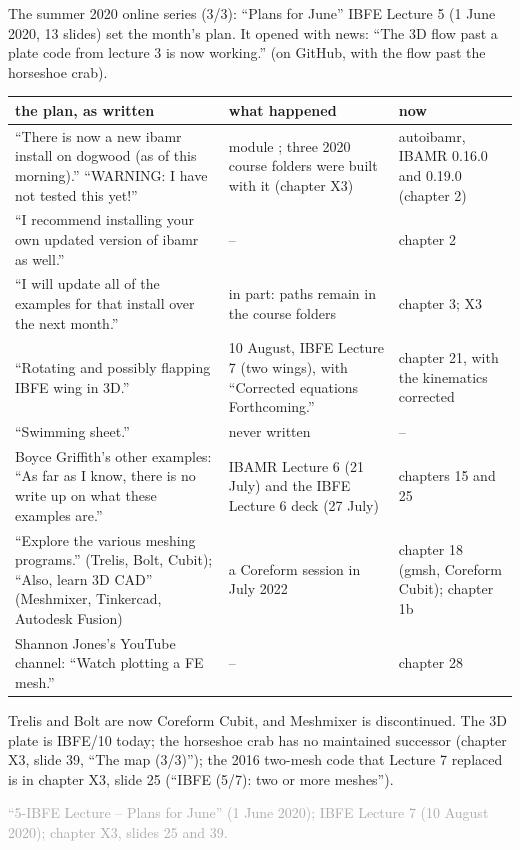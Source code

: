 \documentclass[aspectratio=169,11pt]{beamer}
\newcommand{\sourcecredit}[1]{\vfill\begin{flushright}\tiny\textcolor{DarkGray}{#1}\end{flushright}}
\begin{document}
\begin{frame}{The summer 2020 online series (3/3): ``Plans for June''}
\label{fr:z3}
\footnotesize IBFE Lecture 5 (1 June 2020, 13 slides) set the month's plan. It opened with news: ``The 3D flow past a plate code from lecture 3 is now working.'' (on GitHub, with the flow past the horseshoe crab).

\vspace{1mm}
\tiny
\renewcommand{\arraystretch}{1.15}
\setlength{\tabcolsep}{3pt}
\begin{tabular}{@{}L{0.42\textwidth}L{0.3\textwidth}L{0.22\textwidth}@{}}
\toprule
the plan, as written & what happened & now \\
\midrule
``There is now a new ibamr install on dogwood (as of this morning).'' ``WARNING: I have not tested this yet!'' & module ; three 2020 course folders were built with it (chapter X3) & autoibamr, IBAMR 0.16.0 and 0.19.0 (chapter 2) \\
``I recommend installing your own updated version of ibamr as well.'' & -- & chapter 2 \\
``I will update all of the examples for that install over the next month.'' & in part:  paths remain in the course folders & chapter 3; X3 \\
``Rotating and possibly flapping IBFE wing in 3D.'' & 10 August, IBFE Lecture 7 (two wings), with ``Corrected equations Forthcoming.'' & chapter 21, with the kinematics corrected \\
``Swimming sheet.'' & never written & -- \\
Boyce Griffith's other examples: ``As far as I know, there is no write up on what these examples are.'' & IBAMR Lecture 6 (21 July) and the IBFE Lecture 6 deck (27 July) & chapters 15 and 25 \\
``Explore the various meshing programs.'' (Trelis, Bolt, Cubit); ``Also, learn 3D CAD'' (Meshmixer, Tinkercad, Autodesk Fusion) & a Coreform session in July 2022 & chapter 18 (gmsh, Coreform Cubit); chapter 1b \\
Shannon Jones's YouTube channel: ``Watch plotting a FE mesh.'' & -- & chapter 28 \\
\bottomrule
\end{tabular}

\vspace{1.5mm}
\footnotesize Trelis and Bolt are now Coreform Cubit, and Meshmixer is discontinued. The 3D plate is IBFE/10 today; the horseshoe crab has no maintained successor (chapter X3, slide 39, ``The map (3/3)''); the 2016 two-mesh code that Lecture 7 replaced is in chapter X3, slide 25 (``IBFE (5/7): two or more meshes'').
\sourcecredit{``5-IBFE Lecture -- Plans for June'' (1 June 2020); IBFE Lecture 7 (10 August 2020); chapter X3, slides 25 and 39.}
\end{frame}
\end{document}
